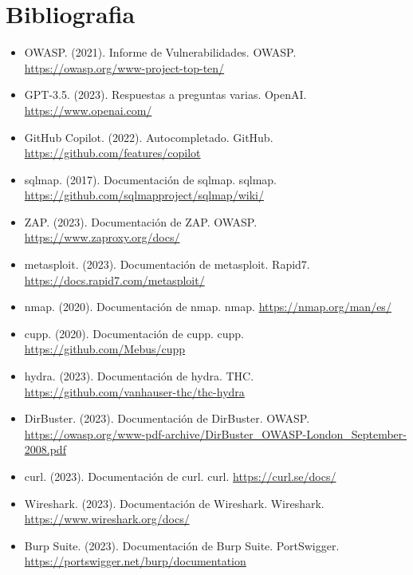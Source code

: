 \documentclass{report}
\begin{document}
    \chapter{Bibliografia}
    \begin{itemize}
        \item OWASP. (2021). Informe de Vulnerabilidades. OWASP. \url{https://owasp.org/www-project-top-ten/}
        \item GPT-3.5. (2023). Respuestas a preguntas varias. OpenAI. \url{https://www.openai.com/}
        \item GitHub Copilot. (2022). Autocompletado. GitHub. \url{https://github.com/features/copilot}
        \item sqlmap. (2017). Documentación de sqlmap. sqlmap. \url{https://github.com/sqlmapproject/sqlmap/wiki/}
        \item ZAP. (2023). Documentación de ZAP. OWASP. \url{https://www.zaproxy.org/docs/}
        \item metasploit. (2023). Documentación de metasploit. Rapid7. \url{https://docs.rapid7.com/metasploit/}
        \item nmap. (2020). Documentación de nmap. nmap. \url{https://nmap.org/man/es/}
        \item cupp. (2020). Documentación de cupp. cupp. \url{https://github.com/Mebus/cupp}
        \item hydra. (2023). Documentación de hydra. THC. \url{https://github.com/vanhauser-thc/thc-hydra}
        \item DirBuster. (2023). Documentación de DirBuster. OWASP. \url{https://owasp.org/www-pdf-archive/DirBuster_OWASP-London_September-2008.pdf}
        \item curl. (2023). Documentación de curl. curl. \url{https://curl.se/docs/}
        \item Wireshark. (2023). Documentación de Wireshark. Wireshark. \url{https://www.wireshark.org/docs/}
        \item Burp Suite. (2023). Documentación de Burp Suite. PortSwigger. \url{https://portswigger.net/burp/documentation}
    \end{itemize}
\end{document}
